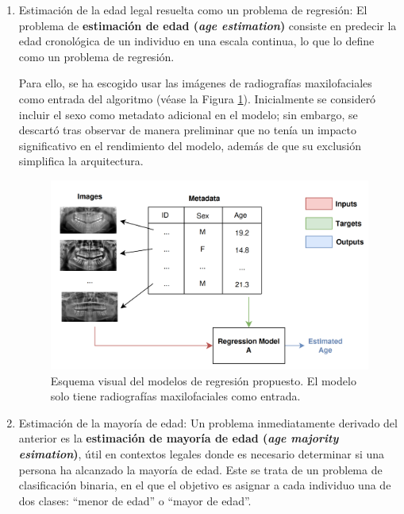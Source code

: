 \begin{enumerate}

    \item Estimación de la edad legal resuelta como un problema de regresión: El problema de \textbf{estimación de edad (\textit{age estimation})} consiste en predecir la edad cronológica de un individuo en una escala continua, lo que lo define como un problema de regresión.

    Para ello, se ha escogido usar las imágenes de radiografías maxilofaciales como entrada del algoritmo (véase la Figura \ref{fig:regression_problems}). Inicialmente se consideró incluir el sexo como metadato adicional en el modelo; sin embargo, se descartó tras observar de manera preliminar que no tenía un impacto significativo en el rendimiento del modelo, además de que su exclusión simplifica la arquitectura. 


    \begin{figure}[htbp]
        \centering
        \includegraphics[width=\textwidth]{capitulos/cap_04/imagenes/regression_problem.png}
        \caption[
            Esquema visual del modelos de regresión propuesto. 
        ]{
            Esquema visual del modelos de regresión propuesto. 
            El modelo solo tiene radiografías maxilofaciales como entrada. 
        } 
        \label{fig:regression_problems}
    \end{figure}
    
    \item Estimación de la mayoría de edad: Un problema inmediatamente derivado del anterior es la \textbf{estimación de mayoría de edad (\textit{age majority esimation})}, útil en contextos legales donde es necesario determinar si una persona ha alcanzado la mayoría de edad. Este se trata de un problema de clasificación binaria, en el que el objetivo es asignar a cada individuo una de dos clases: ``menor de edad'' o ``mayor de edad''.
    

\end{enumerate}
